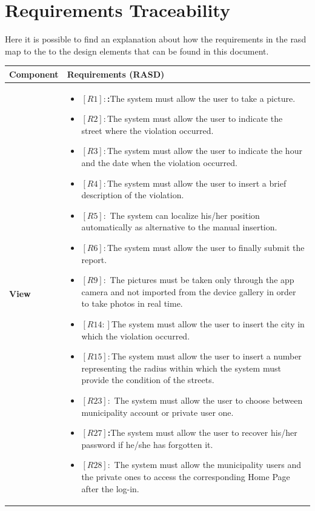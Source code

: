 \documentclass[titlepage]{article}
\begin{document}
\section{ Requirements Traceability}
Here it is possible to find an explanation about how the requirements in the rasd map to the to the design elements that can be found in this document.

\begin{longtable}{| p{7 cm} | p{8 cm} |} \hline
		Component  & Requirements (RASD) 
		 \\ \hline
		\newline \textbf {View} &
		\begin{itemize}
		\item \textbf{$[R1]:$:}The system must allow the user to take a picture. 
		\item \textbf{$[R2]:$}The system must allow the user to indicate the street where the violation occurred. 
		\item \textbf{$[R3]:$}The system must allow the user to indicate the hour and the date when the violation occurred. 
		\item \textbf{$[R4]:$}The system must allow the user to insert a brief description of the violation. 
		\item \textbf{$[R5]:$} The system can localize his/her position automatically as alternative to the manual insertion.
		 \item \textbf{$[R6]:$}The system must allow the user to finally submit the report. 
		 \item \textbf{$[R9]:$} The pictures must be taken only through the app camera and not imported from the device gallery in order to take photos in real time. 
		 \item \textbf{$[R14:]$}The system must allow the user to insert the city in which the violation occurred. 
		 \item \textbf{$[R15]:$}The system must allow the user to insert a number representing the radius within which the system must provide the condition of the streets.
		 \item \textbf{$[R23]:$} The system must allow the user to choose between municipality account or private user one. 
		 \item \textbf{$[R27]$:}The system must allow the user to recover his/her password if he/she has forgotten it.
		 \item \textbf{$[R28]:$} The system must allow the municipality users and the private ones to access the corresponding Home Page after the log-in. 

\end{itemize}
\end{longtable}
\end{document}
